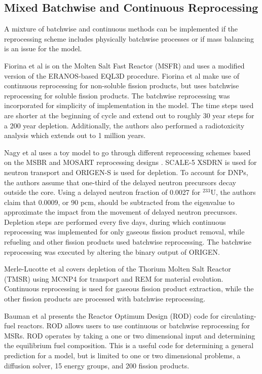 \subsection{Mixed Batchwise and Continuous Reprocessing}
\label{litrev-msr-mixed}

A mixture of batchwise and continuous methods can be implemented if the reprocessing scheme includes physically batchwise processes or if mass balancing is an issue for the model.

Fiorina et al \cite{fiorina_preliminary_2012} is on the Molten Salt Fast Reactor (MSFR) and uses a modified version of the ERANOS-based EQL3D procedure. Fiorina et al make use of continuous reprocessing for non-soluble fission products, but uses batchwise reprocessing for soluble fission products. The batchwise reprocessing was incorporated for simplicity of implementation in the model. The time steps used are shorter at the beginning of cycle and extend out to roughly 30 year steps for a 200 year depletion. Additionally, the authors also performed a radiotoxicity analysis which extends out to 1 million years.

Nagy et al \cite{nagy_parametric_2008} uses a toy model to go through different reprocessing schemes based on the MSBR and MOSART reprocessing designs \cite{robertson_conceptual_1971, ignatiev_progress_2007}. SCALE-5 XSDRN\cite{noauthor_scale_2005} is used for neutron transport and ORIGEN-S is used for depletion. To account for DNPs, the authors assume that one-third of the delayed neutron precursors decay outside the core.
Using a delayed neutron fraction of 0.0027 for $^{233}$U, the authors claim that 0.0009, or 90 pcm, should be subtracted from the eigenvalue to approximate the impact from the movement of delayed neutron precursors.
Depletion steps are performed every five days, during which continuous reprocessing was implemented for only gaseous fission product removal, while refueling and other fission products used batchwise reprocessing.
The batchwise reprocessing was executed by altering the binary output of ORIGEN.

Merle-Lucotte et al \cite{merle-lucotte_thorium_2007} covers depletion of the Thorium Molten Salt Reactor (TMSR) using MCNP4 \cite{goluoglu_software_1998} for transport and REM for material evolution. Continuous reprocessing is used for gaseous fission product extraction, while the other fission products are processed with batchwise reprocessing.

Bauman et al \cite{h_f_bauman_rod_1971} presents the Reactor Optimum Design (ROD) code for circulating-fuel reactors.
ROD allows users to use continuous or batchwise reprocessing for MSRs. ROD operates by taking a one or two dimensional input and determining the equilibrium fuel composition. This is a useful code for determining a general prediction for a model, but is limited to one or two dimensional problems, a diffusion solver, 15 energy groups, and 200 fission products.

